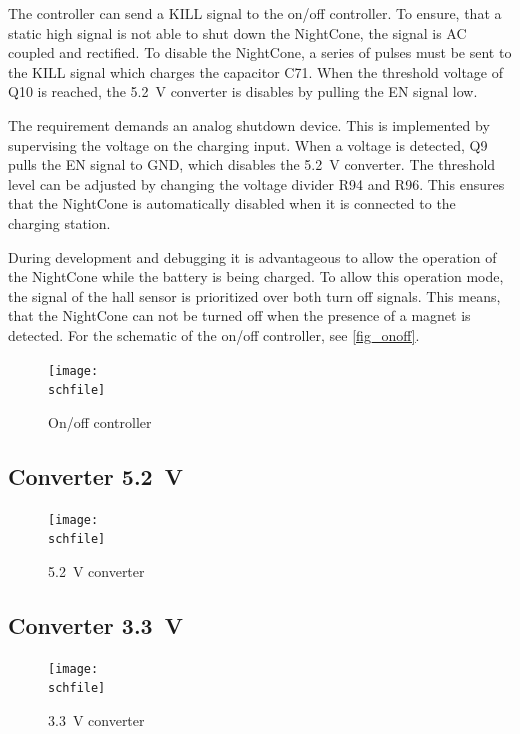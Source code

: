 The controller can send a KILL signal to the on/off controller. To ensure, that a static high signal is not able to shut down the NightCone, the signal is AC coupled and rectified. To disable the NightCone, a series of pulses must be sent to the KILL signal which charges the capacitor C71. When the threshold voltage of Q10 is reached, the \SI{5.2}{\volt} converter is disables by pulling the EN signal low. 

The requirement  demands an analog shutdown device. This is implemented by supervising the voltage on the charging input. When a voltage is detected, Q9 pulls the EN signal to GND, which disables the \SI{5.2}{\volt} converter. The threshold level can be adjusted by changing the voltage divider R94 and R96. This ensures that the NightCone is automatically disabled when it is connected to the charging station. 

During development and debugging it is advantageous to allow the operation of the NightCone while the battery is being charged. To allow this operation mode, the signal of the hall sensor is prioritized over both turn off signals. This means, that the NightCone can not be turned off when the presence of a magnet is detected. For the schematic of the on/off controller, see \autoref{fig_onoff}. 

\begin{figure}[h!]
    \centering
    \texttt{[image: \\schfile]}
    \caption{On/off controller}
    \label{fig_onoff}
\end{figure}

\FloatBarrier

\subsection{Converter \SI{5.2}{\volt}}
\label{sec_power_5V2}

\begin{figure}[h!]
    \centering
    \texttt{[image: \\schfile]}
    \caption{\SI{5.2}{\volt} converter}
    \label{fig_power_5V2}
\end{figure}

\FloatBarrier

\subsection{Converter \SI{3.3}{\volt}}
\label{sec_power_3V3}

\begin{figure}[h!]
    \centering
    \texttt{[image: \\schfile]}
    \caption{\SI{3.3}{\volt} converter}
    \label{fig_power_3V3}
\end{figure}

